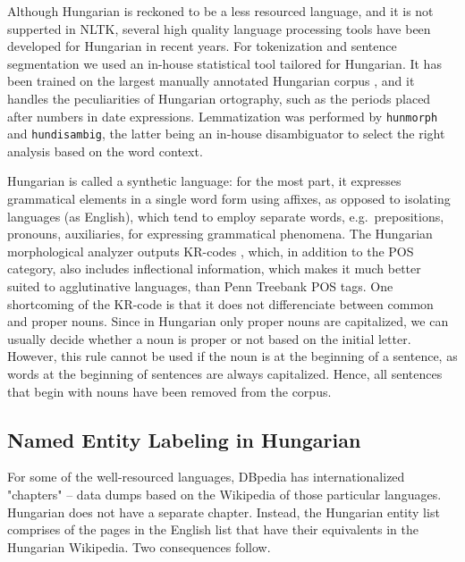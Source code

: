 \documentclass[11pt]{article}
\begin{document}
Although Hungarian is reckoned to be a less resourced language, and it is not supperted in NLTK, several high quality language processing tools have been developed for Hungarian in recent years. For tokenization and sentence segmentation we used an in-house statistical tool tailored for Hungarian. It has been trained on the largest manually annotated Hungarian corpus \cite{Csendes:04}, and it handles the peculiarities of Hungarian ortography, such as the periods placed after numbers in date expressions. Lemmatization was performed by \texttt{hunmorph} \cite{Tron:05} and \texttt{hundisambig}, the latter being an in-house disambiguator to select the right analysis based on the word context. 


Hungarian is called a synthetic language: for the most part, it expresses grammatical elements in a single word form using affixes, as opposed to isolating languages (as English), which tend to employ separate words, e.g.~prepositions, pronouns, auxiliaries, for expressing grammatical phenomena. The Hungarian morphological analyzer outputs KR-codes \cite{Kornai:04}, which, in addition to the POS category, also includes inflectional information, which makes it much better suited to agglutinative languages, than Penn Treebank POS tags. One shortcoming of the KR-code is that it does not differenciate between common and proper nouns. Since in Hungarian only proper nouns are capitalized, we can usually decide whether a noun is proper or not based on the initial letter. However, this rule cannot be used if the noun is at the beginning of a sentence, as words at the beginning of sentences are always capitalized. Hence, all sentences that begin with nouns have been removed from the corpus.

\subsection{Named Entity Labeling in Hungarian}

For some of the well-resourced languages, DBpedia has internationalized "chapters" -- data dumps based on the Wikipedia of those particular languages. Hungarian does not have a separate chapter. Instead, the Hungarian entity list comprises of the pages in the English list that have their equivalents in the Hungarian Wikipedia. Two consequences follow.
\end{document}
